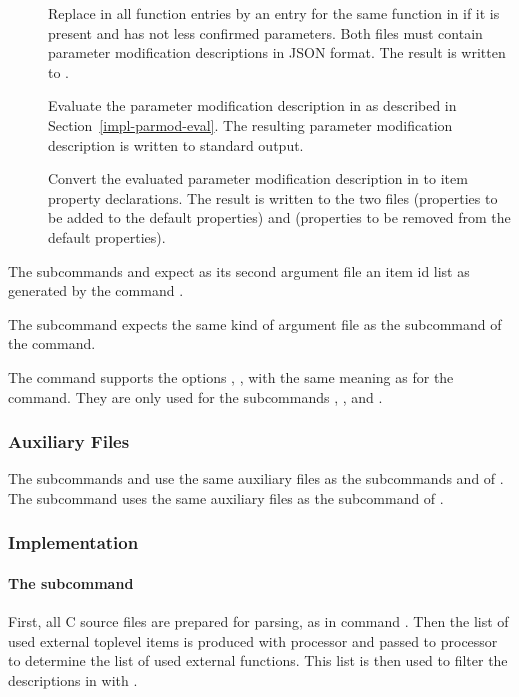 \begin{description}
\item[] Replace in  all function entries by an entry for the same function in 
if it is present and has not less confirmed parameters. Both files must contain 
parameter modification descriptions in JSON format. The result is written to .

\item[] Evaluate the parameter modification description in  as described in 
Section~\ref{impl-parmod-eval}.  The resulting parameter modification description is written to standard output.

\item[] Convert the evaluated parameter modification description in  to item property declarations.
The result is written to the two files  (properties to be added to the default properties) 
and  (properties to be removed from the default properties).

\end{description}

The subcommands  and  expect as its second argument file an item id list as 
generated by the command .

The subcommand  expects the same kind of argument file as the subcommand  
of the  command.

The  command supports the options , ,  with the same meaning as
for the  command. They are only used for the subcommands , , and .

\subsubsection{Auxiliary Files}

The subcommands  and  use the same auxiliary files as the subcommands  and  of .
The subcommand  uses the same auxiliary files as the subcommand  of .

\subsubsection{Implementation}

\paragraph{The subcommand } 
First, all C source files are prepared for parsing, as in command . Then the list of used external toplevel 
items is produced with processor  and passed to processor  to determine the list of 
used external functions. This list is then used to filter the descriptions in  with .

